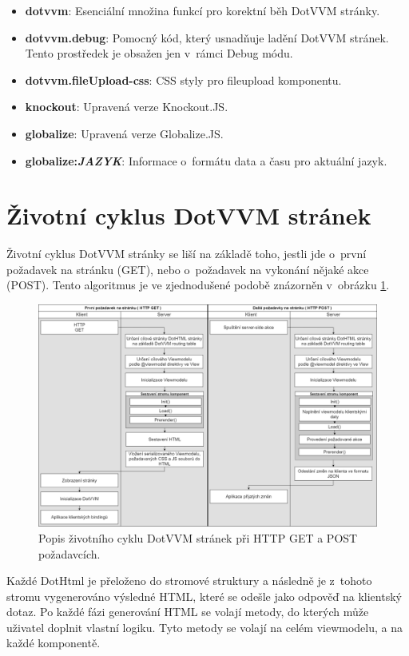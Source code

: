 \begin{itemize}
  \setlength\itemsep{0.2em}
    \item \textbf{dotvvm}:
    Esenciální množina funkcí pro korektní běh DotVVM stránky.
    \item \textbf{dotvvm.debug}:
    Pomocný kód, který usnadňuje ladění DotVVM stránek. Tento prostředek je obsažen jen v~rámci Debug módu.
    \item \textbf{dotvvm.fileUpload-css}: 
    CSS styly pro fileupload komponentu.
    \item \textbf{knockout}: 
    Upravená verze Knockout.JS.
    \item \textbf{globalize}: 
    Upravená verze Globalize.JS.
    \item \textbf{globalize:\textit{JAZYK}}:
    Informace o~formátu data a času pro aktuální jazyk.
\end{itemize}
\section{Životní cyklus DotVVM stránek}
\label{lifecycle}
Životní cyklus DotVVM stránky se liší na základě toho, jestli jde o~první požadavek na stránku (GET), nebo o~požadavek na vykonání nějaké akce (POST)\cite{DotVVM-VM}. Tento algoritmus je ve zjednodušené podobě znázorněn v~obrázku \ref{Get a Post v DotVVM}.
\begin{figure}[!h]
	\centering
	\includegraphics[width=1\textwidth]{obrazky-figures/DotVVM_lifecycle.png}\hfill
	\caption{Popis životního cyklu DotVVM stránek při HTTP GET a POST požadavcích.}
	\label{Get a Post v DotVVM}
\end{figure}

Každé DotHtml je přeloženo do stromové struktury a následně je z~tohoto stromu vygenerováno výsledné HTML, které se odešle jako odpověď na klientský dotaz. Po každé fázi generování HTML se volají metody, do kterých může uživatel doplnit vlastní logiku. Tyto metody se volají na celém viewmodelu, a na každé komponentě.

